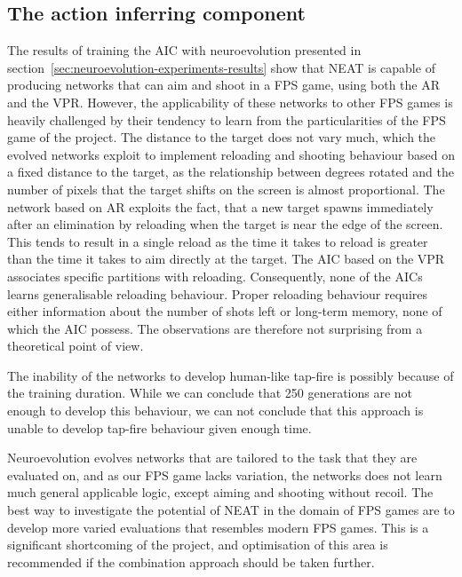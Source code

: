 \subsection{The action inferring component}
The results of training the AIC with neuroevolution presented in section~\ref{sec:neuroevolution-experiments-results} show that NEAT is capable of producing networks that can aim and shoot in a FPS game, using both the AR and the VPR. However, the applicability of these networks to other FPS games is heavily challenged by their tendency to learn from the particularities of the FPS game of the project. The distance to the target does not vary much, which the evolved networks exploit to implement reloading and shooting behaviour based on a fixed distance to the target, as the relationship between degrees rotated and the number of pixels that the target shifts on the screen is almost proportional. The network based on AR exploits the fact, that a new target spawns immediately after an elimination by reloading when the target is near the edge of the screen. This tends to result in a single reload as the time it takes to reload is greater than the time it takes to aim directly at the target. The AIC based on the VPR associates specific partitions with reloading. Consequently, none of the AICs learns generalisable reloading behaviour. Proper reloading behaviour requires either information about the number of shots left or long-term memory, none of which the AIC possess. The observations are therefore not surprising from a theoretical point of view.

The inability of the networks to develop human-like tap-fire is possibly because of the training duration. While we can conclude that 250 generations are not enough to develop this behaviour, we can not conclude that this approach is unable to develop tap-fire behaviour given enough time.

Neuroevolution evolves networks that are tailored to the task that they are evaluated on, and as our FPS game lacks variation, the networks does not learn much general applicable logic, except aiming and shooting without recoil. The best way to investigate the potential of NEAT in the domain of FPS games are to develop more varied evaluations that resembles modern FPS games. This is a significant shortcoming of the project, and optimisation of this area is recommended if the combination approach should be taken further.


